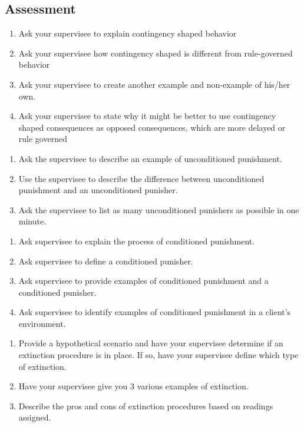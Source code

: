 \subsection{Assessment}
\begin{enumerate}
\item Ask your supervisee to explain contingency shaped behavior 
\item Ask your supervisee how contingency shaped is different from rule-governed behavior
\item Ask your supervisee to create another example and non-example of his/her own. 
\item Ask your supervisee to state why it might be better to use contingency shaped consequences as opposed consequences, which are more delayed or rule governed      
\end{enumerate}
%
\begin{enumerate}
\item Ask the supervisee to describe an example of unconditioned punishment.
\item Use the supervisee to describe the difference between unconditioned punishment and an unconditioned punisher.
\item Ask the supervisee to list as many unconditioned punishers as possible in one minute.
\end{enumerate}
%
\begin{enumerate}
\item Ask supervisee to explain the process of conditioned punishment.
\item Ask supervisee to define a conditioned punisher.
\item Ask supervisee to provide examples of conditioned punishment and a conditioned punisher.
\item Ask supervisee to identify examples of conditioned punishment in a client's environment.
%
\end{enumerate}
%
\begin{enumerate}
\item Provide a hypothetical scenario and have your supervisee determine if an extinction procedure is in place. If so, have your supervisee define which type of extinction.
\item Have your supervisee give you 3 various examples of extinction. 
\item Describe the pros and cons of extinction procedures based on readings assigned.
\end{enumerate}
%
